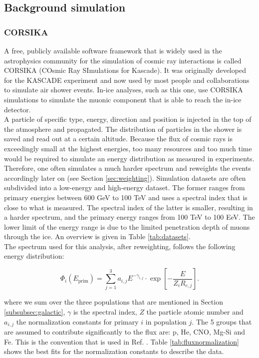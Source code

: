 \subsection{Background simulation}
\subsubsection{CORSIKA}
A free, publicly available software framework that is widely used in the astrophysics community for the simulation of cosmic ray interactions is called CORSIKA  (COsmic Ray SImulations for Kascade). It was originally developed for the KASCADE experiment and now used by most people and collaborations to simulate air shower events. In-ice analyses, such as this one, use CORSIKA simulations to simulate the muonic component that is able to reach the in-ice detector.\\

\noindent A particle of specific type, energy, direction and position is injected in the top of the atmosphere and propagated. The distribution of particles in the shower is saved and read out at a certain altitude. Because the flux of cosmic rays is exceedingly small at the highest energies, too many resources and too much time would be required to simulate an energy distribution as measured in experiments. Therefore, one often simulates a much harder spectrum and reweights the events accordingly later on (see Section \ref{sec:weighting}). Simulation datasets are often subdivided into a low-energy and high-energy dataset. The former ranges from primary energies between 600 GeV to 100 TeV and uses a spectral index that is close to what is measured. The spectral index of the latter is smaller, resulting in a harder spectrum, and the primary energy ranges from 100 TeV to 100 EeV. The lower limit of the energy range is due to the limited penetration depth of muons through the ice. An overview is given in Table \ref{tab:datasets}.\\

\noindent The spectrum used for this analysis, after reweighting, follows the following energy distribution:

\begin{equation}
\label{eq:gaisser}
\Phi_i \left(E_{\textrm{prim}}\right) = \sum^3_{j=1} a_{i,j} E^{-\gamma_{i,j}} \cdot \exp \left[- \frac{E}{Z_i R_{c,j}}\right].
\end{equation}

\noindent where we sum over the three populations that are mentioned in Section \ref{subsubsec:galactic}, $\gamma$ is the spectral index, $Z$ the particle atomic number and $a_{i,j}$ the normalization constants for primary $i$ in population $j$. The 5 groups that are assumed to contribute significantly to the flux are: p, He, CNO, Mg-Si and Fe. This is the convention that is used in Ref. \cite{Gaisser:2013bla}. Table \ref{tab:fluxnormalization} shows the best fits for the normalization constants to describe the data.

